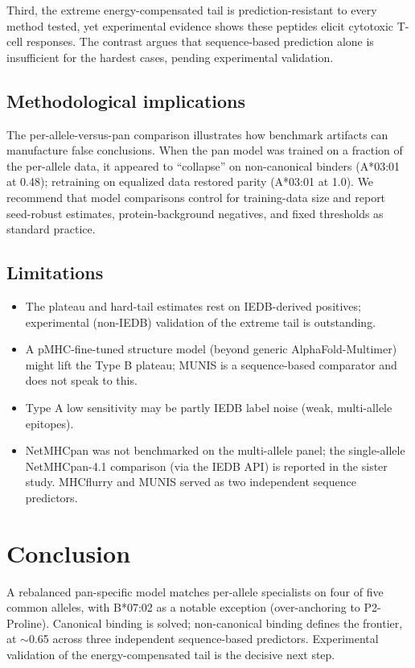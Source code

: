 \documentclass[10pt]{article}
\begin{document}
Third, the extreme energy-compensated tail is prediction-resistant to every method tested, yet experimental evidence shows these peptides elicit cytotoxic T-cell responses. The contrast argues that sequence-based prediction alone is insufficient for the hardest cases, pending experimental validation.

\subsection{Methodological implications}
The per-allele-versus-pan comparison illustrates how benchmark artifacts can manufacture false conclusions. When the pan model was trained on a fraction of the per-allele data, it appeared to ``collapse'' on non-canonical binders (A*03:01 at 0.48); retraining on equalized data restored parity (A*03:01 at 1.0). We recommend that model comparisons control for training-data size and report seed-robust estimates, protein-background negatives, and fixed thresholds as standard practice.

\subsection{Limitations}
\begin{itemize}\itemsep0pt
\item The plateau and hard-tail estimates rest on IEDB-derived positives; experimental (non-IEDB) validation of the extreme tail is outstanding.
\item A pMHC-fine-tuned structure model (beyond generic AlphaFold-Multimer) might lift the Type B plateau; MUNIS is a sequence-based comparator and does not speak to this.
\item Type A low sensitivity may be partly IEDB label noise (weak, multi-allele epitopes).
\item NetMHCpan was not benchmarked on the multi-allele panel; the single-allele NetMHCpan-4.1 comparison (via the IEDB API) is reported in the sister study. MHCflurry and MUNIS served as two independent sequence predictors.
\end{itemize}

\section{Conclusion}
A rebalanced pan-specific model matches per-allele specialists on four of five common alleles, with B*07:02 as a notable exception (over-anchoring to P2-Proline). Canonical binding is solved; non-canonical binding defines the frontier, at $\sim$0.65 across three independent sequence-based predictors. Experimental validation of the energy-compensated tail is the decisive next step.
\end{document}
